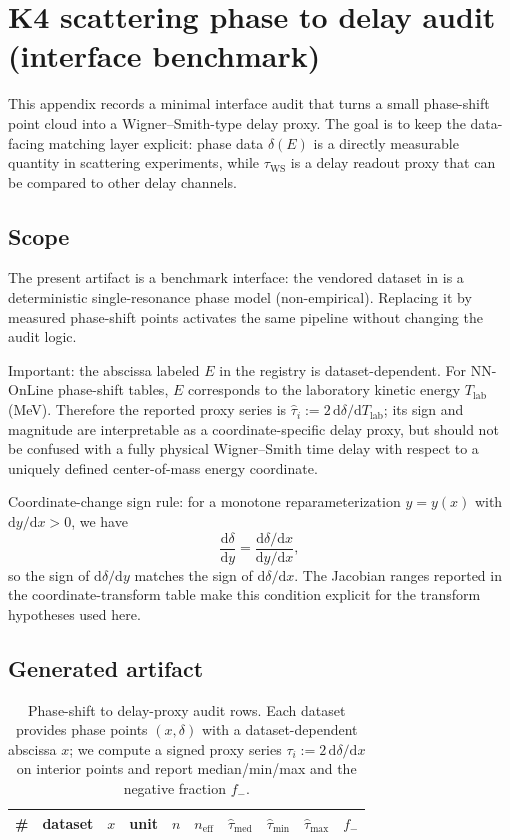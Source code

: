 \section{K4 scattering phase to delay audit (interface benchmark)}
\label{app:k4_scattering_phase_delay_audit}

\AuditTag This appendix records a minimal interface audit that turns a small phase-shift point cloud into a Wigner--Smith-type delay proxy.
The goal is to keep the data-facing matching layer explicit: phase data $\delta(E)$ is a directly measurable quantity in scattering experiments, while $\tau_{\mathrm{WS}}$ is a delay readout proxy that can be compared to other delay channels.

\subsection{Scope}
\AuditTag The present artifact is a benchmark interface: the vendored dataset in  is a deterministic single-resonance phase model (non-empirical).
Replacing it by measured phase-shift points activates the same pipeline without changing the audit logic.

\AuditTag Important: the abscissa labeled $E$ in the registry is dataset-dependent. For NN-OnLine phase-shift tables, $E$ corresponds to the laboratory kinetic energy $T_{\mathrm{lab}}$ (MeV). Therefore the reported proxy series is $\widehat{\tau}_i:=2\,\mathrm{d}\delta/\mathrm{d}T_{\mathrm{lab}}$; its sign and magnitude are interpretable as a coordinate-specific delay proxy, but should not be confused with a fully physical Wigner--Smith time delay with respect to a uniquely defined center-of-mass energy coordinate.

\AuditTag Coordinate-change sign rule: for a monotone reparameterization $y=y(x)$ with $\mathrm{d}y/\mathrm{d}x>0$, we have
$$
\frac{\mathrm{d}\delta}{\mathrm{d}y}=\frac{\mathrm{d}\delta/\mathrm{d}x}{\mathrm{d}y/\mathrm{d}x},
$$
so the sign of $\mathrm{d}\delta/\mathrm{d}y$ matches the sign of $\mathrm{d}\delta/\mathrm{d}x$. The Jacobian ranges reported in the coordinate-transform table make this condition explicit for the transform hypotheses used here.

\subsection{Generated artifact}
\begin{table}[h]
\centering
\small
\begin{tabular}{r l l l r r r r r r}
\toprule
\# & dataset & $x$ & unit & $n$ & $n_{\mathrm{eff}}$ & $\widehat{\tau}_{\mathrm{med}}$ & $\widehat{\tau}_{\min}$ & $\widehat{\tau}_{\max}$ & $f_{-}$ \\
\midrule
%
\end{tabular}
\caption{Phase-shift to delay-proxy audit rows. Each dataset provides phase points $(x,\delta)$ with a dataset-dependent abscissa $x$; we compute a signed proxy series $\tau_i:=2\,\mathrm{d}\delta/\mathrm{d}x$ on interior points and report median/min/max and the negative fraction $f_{-}$.}
\end{table}


